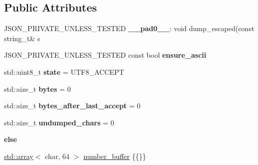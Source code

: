 \subsection*{Public Attributes}
\begin{DoxyCompactItemize}
\item 
\mbox{\label{classnlohmann_1_1detail_1_1serializer_af15da74dab5b01150eabfed0be7d75df}} 
J\+S\+O\+N\+\_\+\+P\+R\+I\+V\+A\+T\+E\+\_\+\+U\+N\+L\+E\+S\+S\+\_\+\+T\+E\+S\+T\+ED {\bfseries \+\_\+\+\_\+pad0\+\_\+\+\_\+}\+: void dump\+\_\+escaped(const string\+\_\+t\& s
\item 
J\+S\+O\+N\+\_\+\+P\+R\+I\+V\+A\+T\+E\+\_\+\+U\+N\+L\+E\+S\+S\+\_\+\+T\+E\+S\+T\+ED const bool {\bfseries ensure\+\_\+ascii}
\item 
\mbox{\label{classnlohmann_1_1detail_1_1serializer_a39b0975f219b542d7ca633652e925b4c}} 
std\+::uint8\+\_\+t {\bfseries state} = U\+T\+F8\+\_\+\+A\+C\+C\+E\+PT
\item 
\mbox{\label{classnlohmann_1_1detail_1_1serializer_a4239a42672c7378a6b449ee010e6dace}} 
std\+::size\+\_\+t {\bfseries bytes} = 0
\item 
\mbox{\label{classnlohmann_1_1detail_1_1serializer_a9ae3daaea1941fd02d4c3c1b0f5fbe68}} 
std\+::size\+\_\+t {\bfseries bytes\+\_\+after\+\_\+last\+\_\+accept} = 0
\item 
\mbox{\label{classnlohmann_1_1detail_1_1serializer_a814f27bba20f0e109d0dbcaa4a399415}} 
std\+::size\+\_\+t {\bfseries undumped\+\_\+chars} = 0
\item 
\mbox{\label{classnlohmann_1_1detail_1_1serializer_ae510f640d26ce0f7d5eb8191b31591c0}} 
{\bfseries else}
\item 
\mbox{\label{classnlohmann_1_1detail_1_1serializer_a1a9d8b344a6cb47728a3519693ec03d1}} 
\hyperlink{namespacenlohmann_1_1detail_a1ed8fc6239da25abcaf681d30ace4985af1f713c9e000f5d3f280adbd124df4f5}{std\+::array}$<$ char, 64 $>$ \hyperlink{classnlohmann_1_1detail_1_1serializer_a1a9d8b344a6cb47728a3519693ec03d1}{number\+\_\+buffer} \{\{\}\}

\end{DoxyCompactItemize}
